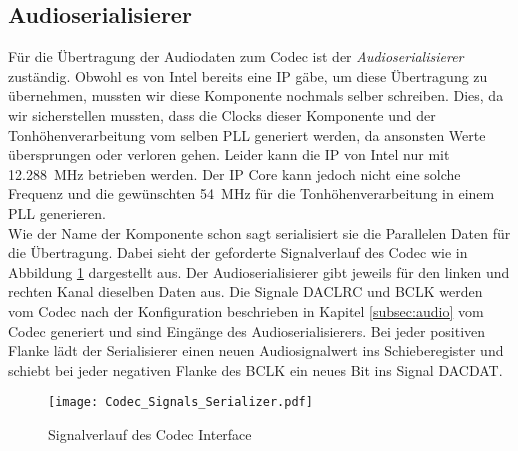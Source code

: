 \subsection{Audioserialisierer}\label{subsec:Audio_Serializer}

Für die Übertragung der Audiodaten zum Codec ist der \textit{Audioserialisierer} zuständig. Obwohl es von Intel bereits eine IP gäbe, um diese Übertragung zu übernehmen, mussten wir diese Komponente nochmals selber schreiben. Dies, da wir sicherstellen mussten, dass die Clocks dieser Komponente und der Tonhöhenverarbeitung vom selben PLL generiert werden, da ansonsten Werte übersprungen oder verloren gehen. Leider kann die IP von Intel nur mit \SI{12.288}{MHz} betrieben werden. Der IP Core kann jedoch nicht eine solche Frequenz und die gewünschten \SI{54}{MHz} für die Tonhöhenverarbeitung in einem PLL generieren.\\
Wie der Name der Komponente schon sagt serialisiert sie die Parallelen Daten für die Übertragung. Dabei sieht der geforderte Signalverlauf des Codec wie in Abbildung \ref{img:Codec_Signals} dargestellt aus. Der Audioserialisierer gibt jeweils für den linken und rechten Kanal dieselben Daten aus. Die Signale DACLRC und BCLK werden vom Codec nach der Konfiguration beschrieben in Kapitel \ref{subsec:audio} vom Codec generiert und sind Eingänge des Audioserialisierers. Bei jeder positiven Flanke lädt der Serialisierer einen neuen Audiosignalwert ins Schieberegister und schiebt bei jeder negativen Flanke des BCLK ein neues Bit ins Signal DACDAT.

\begin{figure}[h!]
	\centering
	\texttt{[image: Codec\_Signals\_Serializer.pdf]}
	\caption{Signalverlauf des Codec Interface} 
	\label{img:Codec_Signals}
\end{figure}  